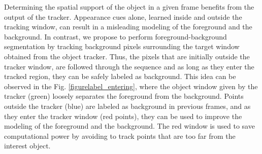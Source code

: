 \label{sec:segm}
Determining the spatial support of the object in a given frame benefits from the output of the tracker. Appearance cues alone, learned inside and outside the tracking window, can result in a misleading modeling of the foreground and the background. In contrast, we propose to perform foreground-background segmentation by tracking background pixels surrounding the target 
window obtained from the object tracker. Thus, the pixels that are initially outside the tracker window, 
are followed through the sequence and as long as they enter the tracked region, they can be safely labeled as background. This idea can be observed in the Fig.  \ref{figurelabel_entering}, 
where the object window given by the tracker (green) loosely separates the foreground from the background. Points outside the tracker (blue) are labeled as background in previous frames, and as they enter the tracker window (red points), they can be used to improve the modeling  of the foreground and the background. The red window is used to save computational power by avoiding to track points that are too far from the interest object.

